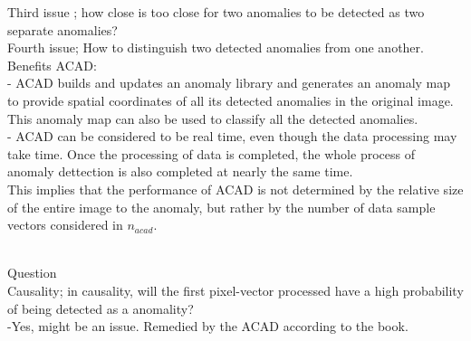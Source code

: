 Third issue ; how close is too close for two anomalies to be detected as two separate anomalies?
\\
Fourth issue; How to distinguish two detected anomalies from one another.
\\ 
Benefits ACAD: \\
- ACAD builds and updates an anomaly library and generates an anomaly map to provide spatial coordinates of all its detected anomalies in the original image. This anomaly map can also be used to classify all the detected anomalies. \\
- ACAD can be considered to be real time, even though the data processing may take time. Once the processing of data is completed, the whole process of anomaly dettection is also completed at nearly the same time. 
\\
This implies that the performance of ACAD is not determined by the relative size of the entire image to the anomaly, but rather by the number of data sample vectors considered in $n_{acad}$.

\\ Question
\\ Causality; in causality, will the first pixel-vector processed have a high probability of being detected as a anomality?\\
-Yes, might be an issue. Remedied by the ACAD according to the book.

